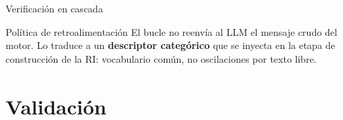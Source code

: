 \documentclass[aspectratio=169]{beamer}
\begin{document}
\begin{frame}{Verificación en cascada}
{%
}

\vspace{0.3cm}
\begin{block}{Política de retroalimentación}
\small El bucle no reenvía al LLM el mensaje crudo del motor. Lo traduce a un \textbf{descriptor categórico} que se inyecta en la etapa de construcción de la RI: vocabulario común, no oscilaciones por texto libre.
\end{block}
\end{frame}

\section{Validación}
\end{document}
